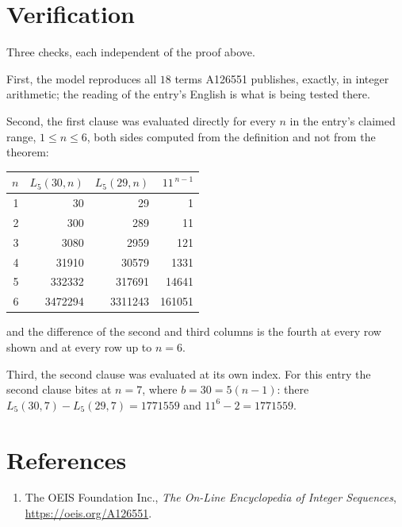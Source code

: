 \documentclass[11pt,a4paper]{article}
\theoremstyle{plain}
\theoremstyle{definition}
\begin{document}
\section{Verification}

Three checks, each independent of the proof above.

First, the model reproduces all $18$ terms A126551 publishes, exactly, in integer
arithmetic; the reading of the entry's English is what is being tested there.

Second, the first clause was evaluated directly for every $n$ in the entry's claimed range,
$1\le n\le6$, both sides computed from the definition and not from the theorem:

\begin{center}
\begin{tabular}{rrrr}
$n$ & $L_{5}(30,n)$ & $L_{5}(29,n)$ & $11^{\,n-1}$ \\ \hline
1 & 30 & 29 & 1 \\
2 & 300 & 289 & 11 \\
3 & 3080 & 2959 & 121 \\
4 & 31910 & 30579 & 1331 \\
5 & 332332 & 317691 & 14641 \\
6 & 3472294 & 3311243 & 161051 \\
\end{tabular}
\end{center}

\noindent and the difference of the second and third columns is the fourth at every row shown
and at every row up to $n=6$.

Third, the second clause was evaluated at its own index. For this entry the second clause bites at $n=7$, where $b=30=5(n-1)$: there $L_{5}(30,7)-L_{5}(29,7)=1771559$ and $11^{6}-2=1771559$.

\section*{References}
\begin{enumerate}
\item The OEIS Foundation Inc., \emph{The On-Line Encyclopedia of Integer Sequences},
\url{https://oeis.org/A126551}.
\end{enumerate}
\end{document}
